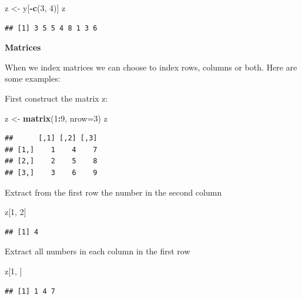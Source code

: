 \documentclass[
]{book}
\newenvironment{Shaded}{\begin{snugshade}}{\end{snugshade}}
\newcommand{\DataTypeTok}[1]{\textcolor[rgb]{0.13,0.29,0.53}{#1}}
\newcommand{\DecValTok}[1]{\textcolor[rgb]{0.00,0.00,0.81}{#1}}
\newcommand{\KeywordTok}[1]{\textcolor[rgb]{0.13,0.29,0.53}{\textbf{#1}}}
\newcommand{\NormalTok}[1]{#1}
\newcommand{\OperatorTok}[1]{\textcolor[rgb]{0.81,0.36,0.00}{\textbf{#1}}}
\newcommand{\StringTok}[1]{\textcolor[rgb]{0.31,0.60,0.02}{#1}}
\begin{document}
\begin{Shaded}
\begin{Highlighting}[]
\NormalTok{z <-}\StringTok{ }\NormalTok{y[}\OperatorTok{-}\KeywordTok{c}\NormalTok{(}\DecValTok{3}\NormalTok{, }\DecValTok{4}\NormalTok{)]}
\NormalTok{z}
\end{Highlighting}
\end{Shaded}

\begin{verbatim}
## [1] 3 5 5 4 8 1 3 6
\end{verbatim}

\textbf{Matrices}

When we index matrices we can choose to index rows, columns or both. Here are some examples:

First construct the matrix z:

\begin{Shaded}
\begin{Highlighting}[]
\NormalTok{z <-}\StringTok{ }\KeywordTok{matrix}\NormalTok{(}\DecValTok{1}\OperatorTok{:}\DecValTok{9}\NormalTok{, }\DataTypeTok{nrow=}\DecValTok{3}\NormalTok{)}
\NormalTok{z}
\end{Highlighting}
\end{Shaded}

\begin{verbatim}
##      [,1] [,2] [,3]
## [1,]    1    4    7
## [2,]    2    5    8
## [3,]    3    6    9
\end{verbatim}

Extract from the first row the number in the second column

\begin{Shaded}
\begin{Highlighting}[]
\NormalTok{z[}\DecValTok{1}\NormalTok{, }\DecValTok{2}\NormalTok{]}
\end{Highlighting}
\end{Shaded}

\begin{verbatim}
## [1] 4
\end{verbatim}

Extract all numbers in each column in the first row

\begin{Shaded}
\begin{Highlighting}[]
\NormalTok{z[}\DecValTok{1}\NormalTok{, ]}
\end{Highlighting}
\end{Shaded}

\begin{verbatim}
## [1] 1 4 7
\end{verbatim}
\end{document}
